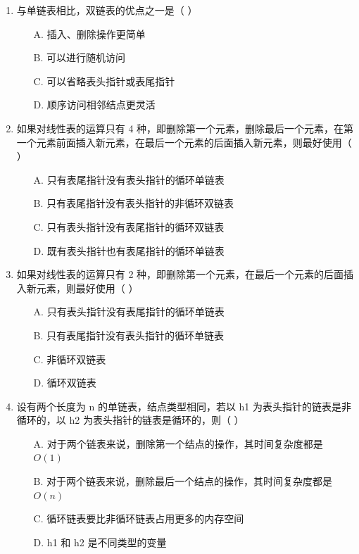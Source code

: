 \documentclass[12pt, a4paper]{article}
\begin{document}
\begin{enumerate}[label=\arabic*.]
	\item 与单链表相比，双链表的优点之一是（ ）
	      \begin{enumerate}
		      \item[A.] 插入、删除操作更简单
		      \item[B.] 可以进行随机访问
		      \item[C.] 可以省略表头指针或表尾指针
		      \item[D.] 顺序访问相邻结点更灵活
	      \end{enumerate}

	\item 如果对线性表的运算只有 4 种，即删除第一个元素，删除最后一个元素，在第一个元素前面插入新元素，在最后一个元素的后面插入新元素，则最好使用（ ）
	      \begin{enumerate}
		      \item[A.] 只有表尾指针没有表头指针的循环单链表
		      \item[B.] 只有表尾指针没有表头指针的非循环双链表
		      \item[C.] 只有表头指针没有表尾指针的循环双链表
		      \item[D.] 既有表头指针也有表尾指针的循环单链表
	      \end{enumerate}

	\item 如果对线性表的运算只有 2 种，即删除第一个元素，在最后一个元素的后面插入新元素，则最好使用（ ）
	      \begin{enumerate}
		      \item[A.] 只有表头指针没有表尾指针的循环单链表
		      \item[B.] 只有表尾指针没有表头指针的循环单链表
		      \item[C.] 非循环双链表
		      \item[D.] 循环双链表
	      \end{enumerate}

	\item 设有两个长度为 n 的单链表，结点类型相同，若以 h1 为表头指针的链表是非循环的，以 h2 为表头指针的链表是循环的，则（ ）
	      \begin{enumerate}
		      \item[A.] 对于两个链表来说，删除第一个结点的操作，其时间复杂度都是 $O(1)$
		      \item[B.] 对于两个链表来说，删除最后一个结点的操作，其时间复杂度都是 $O(n)$
		      \item[C.] 循环链表要比非循环链表占用更多的内存空间
		      \item[D.] h1 和 h2 是不同类型的变量
	      \end{enumerate}


\end{enumerate}
\end{document}
